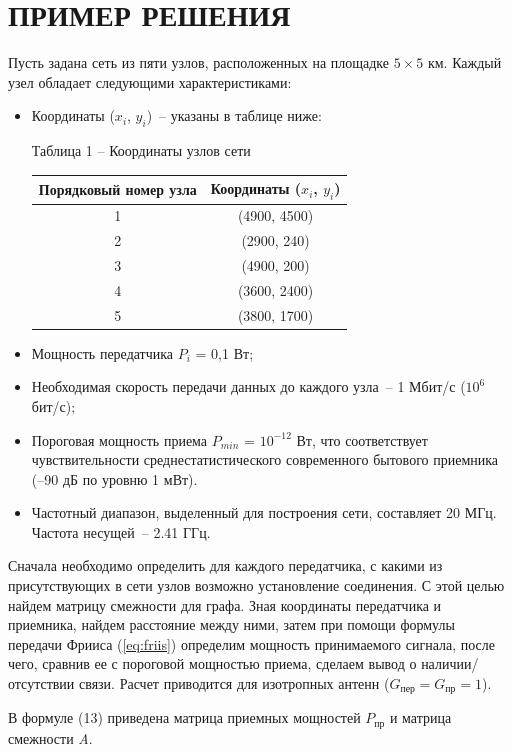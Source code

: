 \documentclass[14pt,a4paper,titlepage]{extarticle}
\begin{document}
\section{ПРИМЕР РЕШЕНИЯ}
Пусть задана сеть из пяти узлов, расположенных на площадке $5\times5$ км. Каждый узел обладает следующими характеристиками:
\begin{itemize}
	\item Координаты ($x_i$, $y_i$)~-- указаны в таблице ниже:
	
	\begin{table}[h]
	Таблица 1 -- Координаты узлов сети \\
	\centering
	\begin{tabular}{|c|c|}
	\hline
	 Порядковый номер узла & Координаты ($x_i$, $y_i$)\\ \hline
	 1 & (4900, 4500) \\ \hline
	 2 & (2900, 240) \\ \hline
	 3 & (4900, 200) \\ \hline
	 4 & (3600, 2400) \\ \hline
	 5 & (3800, 1700) \\ \hline
	\end{tabular}
	\end{table}
	\item Мощность передатчика $P_i$ = 0,1 Вт;
	\item Необходимая скорость передачи данных до каждого узла~-- 1 Мбит/с ($10^6$ бит/с);
	\item Пороговая мощность приема $P_{min}$ = $10^{-12}$ Вт, что соответствует чувствительности среднестатистического современного бытового приемника (--90 дБ по уровню 1 мВт).
	\item Частотный диапазон, выделенный для построения сети, составляет 20 МГц. Частота несущей~-- 2.41 ГГц. 
\end{itemize}

Сначала необходимо определить для каждого передатчика, с какими из присутствующих в сети узлов возможно установление соединения. С этой целью найдем матрицу смежности для графа. Зная координаты передатчика и приемника, найдем расстояние между ними, затем при помощи формулы передачи Фрииса (\ref{eq:friis}) определим мощность принимаемого сигнала, после чего, сравнив ее с пороговой мощностью приема, сделаем вывод о наличии/отсутствии связи. Расчет приводится для изотропных антенн ($G_{\textit{пер}} = G_{\textit{пр}} = 1$). 

В формуле (13) приведена матрица приемных мощностей $P_\textit{пр}$ и матрица смежности \textit{A}.
\end{document}
